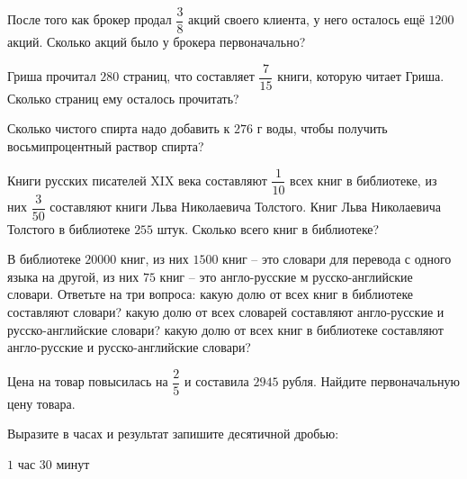 %
\begin{class}[number=5]
	\begin{listofex}
		\item После того как брокер продал \( \dfrac{3}{8} \) акций своего клиента, у него осталось ещё \(1200\) акций. Сколько акций было у брокера первоначально?
		\item Гриша прочитал \(280\) страниц, что составляет \(\dfrac{7}{15}\) книги, которую читает Гриша. Сколько страниц ему осталось прочитать?
		\item Сколько чистого спирта надо добавить к \(276\) г воды, чтобы получить восьмипроцентный раствор спирта?
		\item Книги русских писателей XIX века составляют \(\dfrac{1}{10}\) всех книг в библиотеке, из них \(\dfrac{3}{50}\) составляют книги Льва Николаевича Толстого. Книг Льва Николаевича Толстого в библиотеке \(255\) штук. Сколько всего книг в библиотеке?
		\item В библиотеке \(20000\) книг, из них \(1500\) книг – это словари для перевода с одного языка на другой, из них \(75\) книг – это англо-русские м русско-английские словари. Ответьте на три вопроса: какую долю от всех книг в библиотеке составляют словари? какую долю от всех словарей составляют англо-русские и русско-английские словари? какую долю от всех книг в библиотеке составляют англо-русские и русско-английские словари?
		\item Цена на товар повысилась на \(\dfrac{2}{5}\) и составила \(2945\) рубля. Найдите первоначальную цену товара.
		\item Выразите в часах и результат запишите десятичной дробью:
		\begin{enumcols}[itemcolumns=4]
			\item \(1\) час \(30\) минут

\end{enumcols}
\end{listofex}
\end{class}
